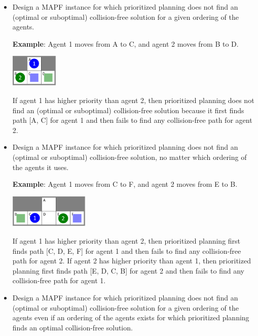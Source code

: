 \documentclass[11pt]{article}
\begin{document}
\begin{itemize}

\item Design a MAPF instance for which prioritized planning does not find an (optimal or suboptimal) collision-free solution for a given ordering of the agents. 

\textbf{Example}: Agent 1 moves from A to C, and agent 2 moves from B to D. 
\begin{center}
\includegraphics[width=0.18\textwidth]{images/sol1.png}
\end{center}
If agent 1 has higher priority than agent 2, then prioritized planning does not find an (optimal or suboptimal) collision-free solution because it first finds path [A, C] for agent 1 and then fails to find any collision-free path for agent 2. 

\item Design a MAPF instance for which prioritized planning does not find an (optimal or suboptimal) collision-free solution, no matter which ordering of the agents it uses. 

\textbf{Example}: Agent 1 moves from C to F, and agent 2 moves from E to B. 
\begin{center}
\includegraphics[width=0.30\textwidth]{images/sol2.png}
\end{center}

If agent 1 has higher priority than agent 2, then prioritized planning first finds path [C, D, E, F] for agent 1 and then fails to find any collision-free path for agent 2. If agent 2 has higher priority than agent 1, then prioritized planning first finds path [E, D, C, B] for agent 2 and then fails to find any collision-free path for agent 1.

\item Design a MAPF instance for which prioritized planning does not find an (optimal or suboptimal) collision-free solution for a given ordering of the agents even if an ordering of the agents exists for which prioritized planning finds an optimal collision-free solution. 


\end{itemize}
\end{document}
